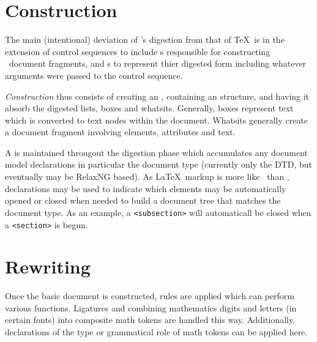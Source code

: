 \documentclass{report}
\begin{document}
\section{Construction}\label{architecture.construction}
The main (intentional) deviation of \LaTeXML's digestion from that of \TeX\ is in the
extension of control sequences to include s responsible for constructing
\XML\ document fragments, and s to represent thier digested form including
whatever arguments were passed to the control sequence.

\emph{Construction} thus consists of creating an , containing
an  structure, and having it absorb the digested lists, boxes
and whatsits.  Generally, boxes represent text which is converted to text nodes within the
document. Whatsits generally create a document fragment involving elements, attributes
and text.  

A  is maintained througout the digestion phase which accumulates
any document model declarations in particular the document type (currently only
the DTD, but eventually may be RelaxNG based).  As \LaTeX\ markup is more
like \SGML\ than \XML, declarations may be used to indicate which elements may
be automatically opened or closed when needed to build a document tree that matches
the document type.  As an example, a \verb|<subsection>| will automaticall be closed
when a \verb|<section>| is begun.

\section{Rewriting}\label{architecture.rewriting}
Once the basic document is constructed,  rules are applied which can
perform various functions. Ligatures and combining mathematics digits and letters (in certain fonts)
into composite math tokens are handled this way.  Additionally, declarations
of the type or grammatical role of math tokens can be applied here.


\end{document}
